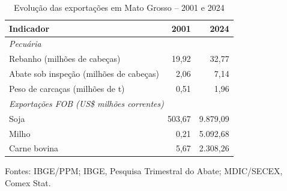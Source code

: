 \begin{table}[htbp]
\centering
\small
\captionstyle{\centering}
\normalcaption
\caption{Evolução das exportações em Mato Grosso -- 2001 e 2024}
\label{tab:h1-oferta-contexto}
\begin{tabular}{lrr}
\hline
Indicador & 2001 & 2024 \\
\hline
\multicolumn{3}{l}{\textit{Pecuária}} \\
Rebanho (milhões de cabeças) & 19,92 & 32,77 \\
Abate sob inspeção (milhões de cabeças) & 2,06 & 7,14 \\
Peso de carcaças (milhões de t) & 0,51 & 1,96 \\
\hline
\multicolumn{3}{l}{\textit{Exportações FOB (US\$ milhões correntes)}} \\
Soja & 503,67 & 9.879,09 \\
Milho & 0,21 & 5.092,68 \\
Carne bovina & 5,67 & 2.308,26 \\
\hline
\end{tabular}
\par\smallskip\begin{minipage}{\textwidth}\footnotesize
\centering
Fontes: IBGE/PPM; IBGE, Pesquisa Trimestral do Abate; MDIC/SECEX, Comex Stat.
\end{minipage}
\end{table}
